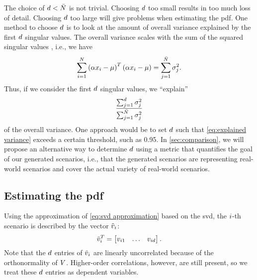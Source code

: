 The choice of $d < \bar{N}$ is not trivial.
Choosing $d$ too small results in too much loss of detail.
Choosing $d$ too large will give problems when estimating the \ac{pdf}.
One method to choose $d$ is to look at the amount of overall variance explained by the first $d$ singular values.
The overall variance scales with the sum of the squared singular values \autocite[p.~77]{golub2013matrix}, i.e., we have
\begin{equation}
	\sum_{i=1}^{N} \left( \alpha x_{i}-\mu \right)^T \left( \alpha x_{i}-\mu \right) 
	= \sum_{j=1}^{\bar{N}} \sigma_{j}^2.
\end{equation}
Thus, if we consider the first $d$ singular values, we ``explain''
\begin{equation}
	\label{eq:explained variance}
	\frac{\sum_{j=1}^{d} \sigma_{j}^2}{\sum_{j=1}^{\bar{N}} \sigma_{j}^2}
\end{equation}
of the overall variance.
One approach would be to set $d$ such that \cref{eq:explained variance} exceeds a certain threshold, such as 0.95.
In \cref{sec:comparison}, we will propose an alternative way to determine $d$ using a metric that quantifies the goal of our generated scenarios, i.e., that the generated scenarios are representing real-world scenarios and cover the actual variety of real-world scenarios.



\subsection{Estimating the \acl{pdf}}
\label{sec:kde}

Using the approximation of \cref{eq:svd approximation} based on the \ac{svd}, the $i$-th scenario is described by the vector $\tilde{v}_{i}$:
\begin{equation}
	\tilde{v}_{i}^T = \begin{bmatrix}
		v_{i 1} & \ldots & v_{i d}
	\end{bmatrix}.
\end{equation}
Note that the $d$ entries of $\tilde{v}_{i}$ are linearly uncorrelated because of the orthonormality of $V$.
Higher-order correlations, however, are still present, so we treat these $d$ entries as dependent variables.

